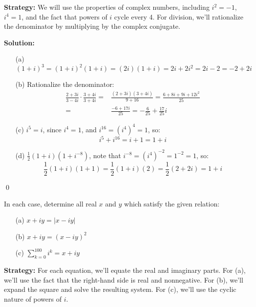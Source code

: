 \noindent\textbf{Strategy:} We will use the properties of complex numbers, including $i^2 = -1$, $i^4 = 1$, and the fact that powers of $i$ cycle every 4. For division, we'll rationalize the denominator by multiplying by the complex conjugate.

\bigskip\noindent\textbf{Solution:}

\begin{itemize}
\item[(a)] \( (1 + i)^3 = (1 + i)^2 (1 + i) = (2i)(1 + i) = 2i + 2i^2 = 2i - 2 = -2 + 2i \)

\item[(b)] Rationalize the denominator:
\begin{align*}
\frac{2 + 3i}{3 - 4i} \cdot \frac{3 + 4i}{3 + 4i} =& \frac{(2 + 3i)(3 + 4i)}{9 + 16} = \frac{6 + 8i + 9i + 12i^2}{25} \\
=& \frac{-6 + 17i}{25} = -\frac{6}{25} + \frac{17}{25}i
\end{align*}

\item[(c)] \( i^5 = i \), since \( i^4 = 1 \), and \( i^{16} = (i^4)^4 = 1 \), so:
\[
i^5 + i^{16} = i + 1 = 1 + i
\]

\item[(d)] \( \frac{1}{2}(1 + i)(1 + i^{-8}) \), note that \( i^{-8} = (i^4)^{-2} = 1^{-2} = 1 \), so:
\[
\frac{1}{2}(1 + i)(1 + 1) = \frac{1}{2}(1 + i)(2) = \frac{1}{2}(2 + 2i) = 1 + i
\]
\end{itemize}\qed


\begin{problembox}
\begin{problemstatement}
In each case, determine all real \( x \) and \( y \) which satisfy the given relation:

\begin{enumerate}
\item[(a)] \( x + iy = |x - iy| \)
\item[(b)] \( x + iy = (x - iy)^2 \)
\item[(c)] \( \sum_{k=0}^{100} i^k = x + iy \)
\end{enumerate}
\end{problemstatement}
\end{problembox}

\noindent\textbf{Strategy:} For each equation, we'll equate the real and imaginary parts. For (a), we'll use the fact that the right-hand side is real and nonnegative. For (b), we'll expand the square and solve the resulting system. For (c), we'll use the cyclic nature of powers of $i$.

